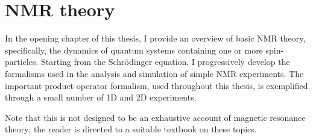 \chapter{NMR theory}
\label{chpt:theory}

In the opening chapter of this thesis, I provide an overview of basic NMR theory, specifically, the dynamics of quantum systems containing one or more spin-\half{} particles.
Starting from the Schr\"odinger equation, I progressively develop the formalisms used in the analysis and simulation of simple NMR experiments.
The important product operator formalism, used throughout this thesis, is exemplified through a small number of 1D and 2D experiments.

Note that this is not designed to be an exhaustive account of magnetic resonance theory; the reader is directed to a suitable textbook on these topics.






\printbibliography[heading=subbibnumbered]{}
